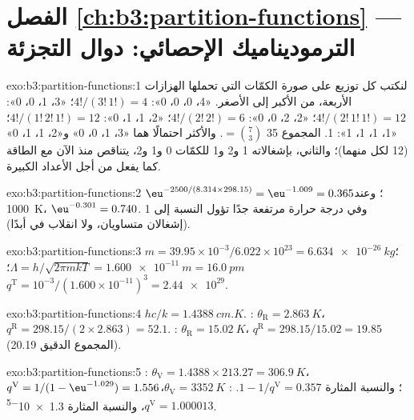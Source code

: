 \section*{الفصل \ref{ch:b3:partition-functions} --- الترموديناميك الإحصائي: دوال التجزئة}

\begin{solution}{exo:b3:partition-functions:1}
لنكتب كل توزيع على صورة الكمّات التي تحملها الهزازات الأربعة، من الأكبر
إلى الأصغر. «4، 0، 0، 0»: $4!/(3!\,1!) = 4$؛ «3، 1، 0، 0»: $4!/(2!\,1!\,1!) = 12$؛ «2، 2، 0، 0»:
$4!/(2!\,2!) = 6$؛ «2، 1، 1، 0»: $4!/(1!\,2!\,1!) = 12$؛ «1، 1، 1، 1»: 1. المجموع 35 $= \binom73$.
والأكثر احتمالًا هما «3، 1، 0، 0» و«2، 1، 1، 0» (12 لكل منهما)؛ والثاني، بإشغالاته
1 و2 و1 للكمّات 0 و1 و2، يتناقص منذ الآن مع الطاقة كما يفعل
 من أجل الأعداد الكبيرة.
\end{solution}

\begin{solution}{exo:b3:partition-functions:2}
$\eu^{-2500/(8.314 \times 298.15)} = \eu^{-1.009} = 0.365$؛ وعند \qty{1000}{K}، $\eu^{-0.301} = 0.740$. وفي درجة حرارة
مرتفعة جدًا تؤول النسبة إلى 1 (إشغالان متساويان، ولا انقلاب في  أبدًا).
\end{solution}

\begin{solution}{exo:b3:partition-functions:3}
$m = 39.95\times10^{-3}/6.022\times10^{23} = \qty{6.634e-26}{kg}$؛ $\Lambda = h/\sqrt{2\pi mkT} =
\qty{1.600e-11}{m} = \qty{16.0}{pm}$؛ $q^{\mathrm T} = 10^{-3}/(1.600\times10^{-11})^3 = \num{2.44e29}$.
\end{solution}

\begin{solution}{exo:b3:partition-functions:4}
$hc/k = \qty{1.4388}{cm.K}$. : $\theta_{\mathrm R} = \qty{2.863}{K}$، $q^{\mathrm R} = 298.15/(2 \times 2.863) = 52.1$.
: $\theta_{\mathrm R} = \qty{15.02}{K}$، $q^{\mathrm R} = 298.15/15.02 = 19.85$ (المجموع الدقيق 20.19).
\end{solution}

\begin{solution}{exo:b3:partition-functions:5}
: $\theta_{\mathrm V} = 1.4388 \times 213.27 = \qty{306.9}{K}$، $q^{\mathrm V} = 1/(1 - \eu^{-1.029}) = 1.556$؛
والنسبة المثارة $1 - 1/q^{\mathrm V} = 0.357$. : $\theta_{\mathrm V} = \qty{3352}{K}$، $q^{\mathrm V} = 1.000013$،
والنسبة المثارة \num{1.3e-5}.
\end{solution}

